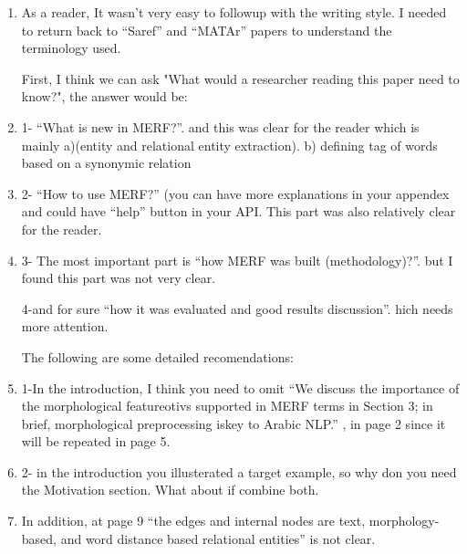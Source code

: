 \begin{enumerate}[leftmargin=0mm,label=\bfseries CommentR3.\arabic*]
\item \label{Review.3.1}
As a reader, It wasn't very easy to followup with the writing 
style. I needed to return back to ``Saref'' and ``MATAr'' papers 
to understand the terminology used.

First, I think we can ask 
"What would a researcher reading this paper need to know?", the answer would be:

\item \label{Review.3.2}
1- ``What is new in MERF?''. and this was clear for the reader 
    which is mainly
    a)(entity and relational entity extraction).
    b) defining tag of words based on a synonymic relation

\item \label{Review.3.3}
2- ``How to use MERF?''
(you can have more explanations in your appendex and could have 
``help'' button in your API. This part was also relatively 
clear for the reader.


\item \label{Review.3.4}
3- The most important part is ``how MERF was built 
(methodology)?''. but I found this part was not very clear.

4-and for sure ``how it was evaluated and good results discussion''. hich needs more attention.


The following are some detailed recomendations:


\item \label{Review.3.5}
1-In the introduction, I think you need to omit ``We discuss the importance of the morphological featureotivs supported in MERF terms in Section 3; in brief, morphological preprocessing iskey to Arabic NLP.'' , in page 2 since it will be repeated in page 5.


\item \label{Review.3.6}
2- in the introduction you illusterated a target example, 
so why don you need the Motivation section. 
What about if combine both.

\item \label{Review.3.7}
In addition, at page 9 ``the edges and internal nodes are text, 
morphology-based, and word distance based relational entities'' 
is not clear.



\end{enumerate}
